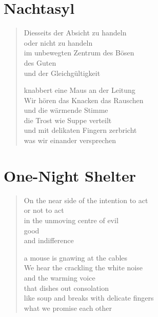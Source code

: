 
\cleartoverso

\section{Nachtasyl}

\begin{verse}

Diesseits der Absicht zu handeln\\
oder nicht zu handeln\\
im unbewegten Zentrum des Bösen\\
des Guten\\
und der Gleichgültigkeit

knabbert eine Maus an der Leitung\\
Wir hören das Knacken das Rauschen\\
und die wärmende Stimme\\
die Trost wie Suppe verteilt\\
und mit delikaten Fingern zerbricht\\
was wir einander versprechen

\end{verse}

\clearpage

\section{One-Night Shelter}

\begin{verse}

On the near side of the intention to act\\
or not to act\\
in the unmoving centre of evil\\
good\\
and indifference

a mouse is gnawing at the cables\\
We hear the crackling the white noise\\
and the warming voice\\
that dishes out consolation\\
like soup and breaks with delicate fingers\\
what we promise each other

\end{verse}
